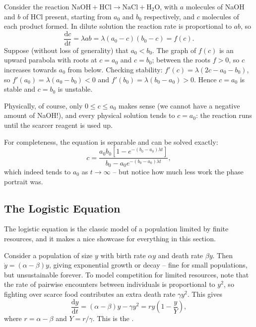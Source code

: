\documentclass[a4paper]{scrartcl}
\begin{document}
\begin{example}
	Consider the reaction $\mathrm{NaOH} + \mathrm{HCl} \to \mathrm{NaCl} + \mathrm{H_2O}$, with $a$ molecules of NaOH and $b$ of HCl present, starting from $a_0$ and $b_0$ respectively, and $c$ molecules of each product formed. In dilute solution the reaction rate is proportional to $ab$, so
	$$
	\frac{\mathrm{d}c}{\mathrm{d}t} = \lambda a b = \lambda (a_0 - c)(b_0 - c) = f(c).
	$$
	Suppose (without loss of generality) that $a_0 < b_0$. The graph of $f(c)$ is an upward parabola with roots at $c = a_0$ and $c = b_0$; between the roots $f > 0$, so $c$ increases towards $a_0$ from below. Checking stability: $f'(c) = \lambda(2c - a_0 - b_0)$, so $f'(a_0) = \lambda (a_0 - b_0) < 0$ and $f'(b_0) = \lambda(b_0 - a_0) > 0$. Hence $c = a_0$ is stable and $c = b_0$ is unstable.

	\begin{center}
	\end{center}

	Physically, of course, only $0 \leq c \leq a_0$ makes sense (we cannot have a negative amount of NaOH!), and every physical solution tends to $c = a_0$: the reaction runs until the scarcer reagent is used up.

	For completeness, the equation is separable and can be solved exactly:
	$$
	c = \frac{a_0 b_0 \left[1 - e^{-(b_0 - a_0)\lambda t}\right]}{b_0 - a_0 e^{-(b_0 - a_0)\lambda t}},
	$$
	which indeed tends to $a_0$ as $t \to \infty$ -- but notice how much less work the phase portrait was.
\end{example}

\subsection{The Logistic Equation}

The logistic equation is the classic model of a population limited by finite resources, and it makes a nice showcase for everything in this section.

Consider a population of size $y$ with birth rate $\alpha y$ and death rate $\beta y$. Then $\dot y = (\alpha - \beta) y$, giving exponential growth or decay -- fine for small populations, but unsustainable forever. To model competition for limited resources, note that the rate of pairwise encounters between individuals is proportional to $y^2$, so fighting over scarce food contributes an extra death rate $\gamma y^2$. This gives
$$
\frac{\mathrm{d}y}{\mathrm{d}t} = (\alpha - \beta) y - \gamma y^2 = r y \left(1 - \frac{y}{Y}\right),
$$
where $r = \alpha - \beta$ and $Y = r/\gamma$. This is the .
\end{document}
